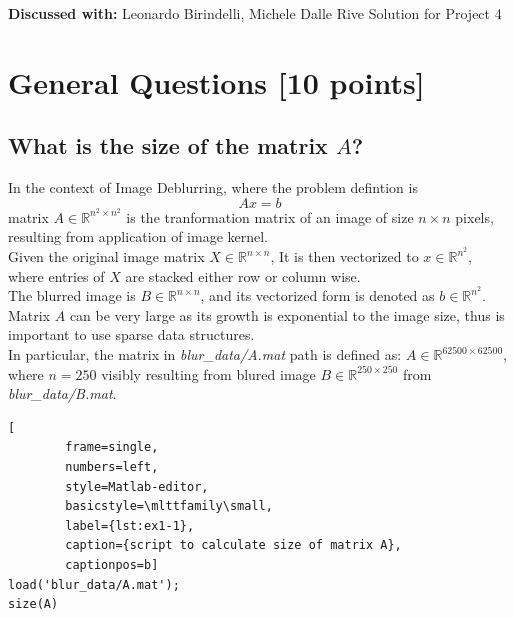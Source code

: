 \documentclass[unicode,11pt,a4paper,oneside,numbers=endperiod,openany]{scrartcl}
\begin{document}
\setassignment
{}

{\textbf{Discussed with:} Leonardo Birindelli, Michele Dalle Rive}
{Solution for Project 4}{}
\newline

\assignmentpolicy


\newpage

\section{General Questions [10 points]}

\subsection{What is the size of the matrix $A$?}
\label{ex:1.1}

In the context of Image Deblurring, where the problem defintion is
\begin{equation}\label{eq:problem}
    Ax = b
\end{equation}
matrix $A \in \mathbb{R}^{n^2 \times n^2}$ is the tranformation matrix
of an image of size $n \times n$ pixels, resulting from application of image kernel.\\
Given the original image matrix $X \in \mathbb{R}^{n \times n}$,
It is then vectorized to $x \in \mathbb{R}^{n^2}$,
where entries of $X$ are stacked either row or column wise.\\
The blurred image is $B \in \mathbb{R}^{n \times n}$,
and its vectorized form is denoted as $b \in \mathbb{R}^{n^2}$.\\\newline
Matrix $A$ can be very large as its growth is exponential to the image size,
thus is important to use sparse data structures.\\
In particular, the matrix in \textit{blur\_data/A.mat} path is defined as:
$A \in \mathbb{R}^{62500 \times 62500}$,
where $n = 250$ visibly resulting from blured image $B \in \mathbb{R}^{250 \times 250}$
from \textit{blur\_data/B.mat}.

\begin{lstlisting}[
        frame=single,
        numbers=left,
        style=Matlab-editor,
        basicstyle=\mlttfamily\small,
        label={lst:ex1-1},
        caption={script to calculate size of matrix A},
        captionpos=b]
load('blur_data/A.mat');
size(A)
\end{lstlisting}
\end{document}
